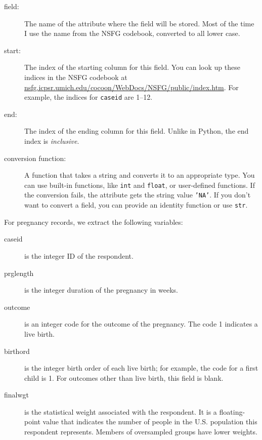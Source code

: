 \documentclass[12pt]{book}
\begin{document}
\begin{description}

\item[field:] The name of the attribute where the field
will be stored.  Most of the time I use the name from the
NSFG codebook, converted to all lower case.

\item[start:] The index of the starting column for this
field.  You can look up these indices in the NSFG codebook
at \url{nsfg.icpsr.umich.edu/cocoon/WebDocs/NSFG/public/index.htm}.
For example, the indices for {\tt caseid} are
1--12.

\item[end:] The index of the ending column for this
field.  Unlike in Python, the end index is {\em inclusive}.

\item[conversion function:] A function that takes a string
and converts it to an appropriate type.  You can use built-in
functions, like {\tt int} and {\tt float}, or user-defined
functions.  If the conversion fails, the attribute gets the
string value {\tt 'NA'}.  If you don't want to convert a
field, you can provide an identity function or use {\tt str}.

\end{description}

For pregnancy records, we extract the following variables:

\begin{description}

\item[caseid] is the integer ID of the respondent.

\item[prglength] is the integer duration of the pregnancy in weeks.

\item[outcome] is an integer code for the outcome of the pregnancy.
The code 1 indicates a live birth.

\item[birthord] is the integer birth order of each live birth;
for example, the code for a first child is 1. 
For outcomes other than live birth, this field is blank.

\item[finalwgt] is the statistical weight associated with the respondent.
It is a floating-point value that indicates the number of people in
the U.S. population this respondent represents.  Members of oversampled
groups have lower weights.

\end{description}
\end{document}
